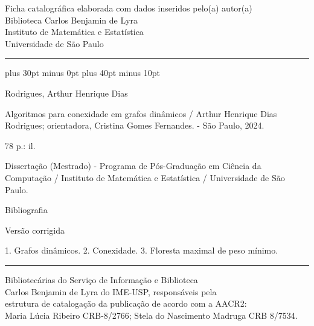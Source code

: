 \begingroup\centering\singlespacing\small
{}
Ficha catalográfica elaborada com dados inseridos pelo(a) autor(a)\\
Biblioteca Carlos Benjamin de Lyra\\
Instituto de Matemática e Estatística\\
Universidade de São Paulo\par
\vspace{2\baselineskip}\hrule\vspace{.8\baselineskip}
\RaggedRightRightskip 0pt plus 30pt minus 0pt\relax
\RaggedRightParfillskip 20pt plus 40pt minus 10pt\relax
\ttfamily\hspace{2em}\begin{minipage}[t]{125mm}
\RaggedRight\sloppy{}

\noindent Rodrigues, Arthur Henrique Dias

Algoritmos para conexidade em grafos dinâmicos / Arthur Henrique Dias Rodrigues; orientadora, Cristina Gomes Fernandes. - São Paulo, 2024.

78 p.: il.

\vspace{1\baselineskip}


\vspace{1\baselineskip}


Dissertação (Mestrado) - Programa de Pós-Graduação em Ciência da Computação / Instituto de Matemática e Estatística / Universidade de São Paulo.

Bibliografia

Versão corrigida

\vspace{1\baselineskip}


\vspace{1\baselineskip}


1. Grafos dinâmicos. 2. Conexidade. 3. Floresta maximal de peso mínimo.

\end{minipage}\par
\vspace{1\baselineskip}\hrule\vspace{.5\baselineskip}\rmfamily
Bibliotecárias do Serviço de Informação e Biblioteca\\
Carlos Benjamin de Lyra do IME-USP, responsáveis pela\\
estrutura de catalogação da publicação de acordo com a AACR2:\\
Maria Lúcia Ribeiro CRB-8/2766; Stela do Nascimento Madruga CRB 8/7534.
\par\endgroup
